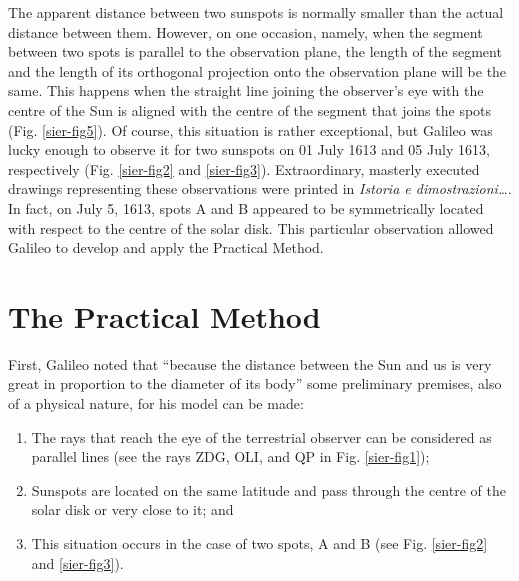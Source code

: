 \begin{artengenv}
The apparent distance between two sunspots is normally smaller than the actual distance between them. However, on one
occasion, namely, when the segment between two spots is parallel to the observation plane, the length of the segment
and the length of its orthogonal projection onto the observation plane will be the same. This happens when the straight
line joining the observer’s eye with the centre of the Sun is aligned with the centre of the segment that joins the
spots (Fig. \ref{sier-fig5}). Of course, this situation is rather exceptional, but Galileo was lucky enough to observe it for two
sunspots on 01 July 1613 and 05 July 1613, respectively (Fig. \ref{sier-fig2} and \ref{sier-fig3}). Extraordinary, masterly executed drawings
representing these observations were printed in \textit{Istoria e dimostrazioni\ldots. }In fact, on July 5, 1613, spots A
and B appeared to be symmetrically located with respect to the centre of the solar disk. This particular observation
allowed Galileo to develop and apply the Practical Method. 

\section{The Practical Method}

First, Galileo noted that ``because the distance between the Sun and us is very great in proportion to the diameter of
its body''
\parencite[see OG V, 121.5;][p.112]{galilei_sunspots_2010}
some preliminary premises, also of a physical
nature, for his model can be made: 

\begin{enumerate}
	\item The rays that reach the eye of the terrestrial observer can be considered as parallel lines (see the rays ZDG, OLI,
	and QP in Fig. \ref{sier-fig1});
	\item Sunspots are located on the same latitude and pass through the centre of the solar disk or very close to it; and
	\item This situation occurs in the case of two spots, A and B (see Fig. \ref{sier-fig2} and \ref{sier-fig3}).
\end{enumerate}


\end{artengenv}
